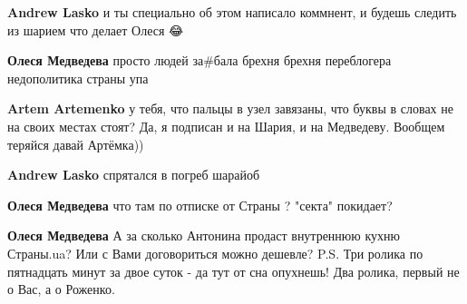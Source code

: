 \begin{itemize}
\begin{itemize}
\textbf{Andrew Lasko} и ты специально об этом написало коммнент, и будешь следить из шарием что делает Олеся 😂

 
\textbf{Олеся Медведева} просто людей за\#бала брехня брехня переблогера недополитика страны упа

 
\textbf{Artem Artemenko} у тебя, что пальцы в узел завязаны, что буквы в словах не на своих местах стоят? Да, я подписан и на Шария, и на Медведеву. Вообщем теряйся давай Артёмка))

 
\textbf{Andrew Lasko} спрятался в погреб шарайоб 🤙

 
\textbf{Олеся Медведева} что там по отписке от Страны ? "секта" покидает?

 
\textbf{Олеся Медведева} А за сколько Антонина продаст внутреннюю кухню Страны.ua? Или с Вами договориться можно дешевле?
P.S. Три ролика по пятнадцать минут за двое суток - да тут от сна опухнешь! Два ролика, первый не о Вас, а о Роженко.

 

\end{itemize}
\end{itemize}

